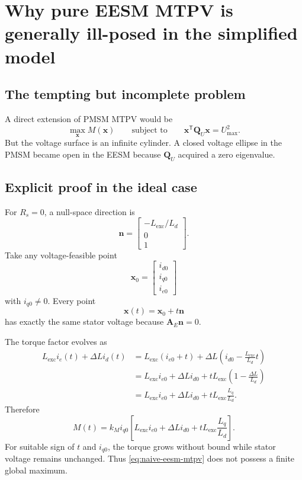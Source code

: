 \documentclass[11pt,a4paper]{article}
\newcommand{\Rs}{R_s}
\newcommand{\Ld}{L_d}
\newcommand{\Lq}{L_q}
\newcommand{\Lexc}{L_{\mathrm{exc}}}
\newcommand{\Umax}{U_{\max}}
\newcommand{\T}{\mathsf{T}}
\newcommand{\vct}[1]{\bm{#1}}
\newcommand{\mat}[1]{\bm{#1}}
\begin{document}
\section{Why pure EESM MTPV is generally ill-posed in the simplified model}

\subsection{The tempting but incomplete problem}

A direct extension of PMSM MTPV would be
\begin{equation}
  \max_{\vct x}M(\vct x)
  \qquad\text{subject to}\qquad
  \vct x^\T\mat Q_U\vct x=\Umax^2.
  \label{eq:naive-eesm-mtpv}
\end{equation}
But the voltage surface is an infinite cylinder. A closed voltage ellipse in the PMSM became open in the EESM because $\mat Q_U$ acquired a zero eigenvalue.

\subsection{Explicit proof in the ideal case}

For $\Rs=0$, a null-space direction is
\begin{equation}
  \vct n=
  \begin{bmatrix}
  -\Lexc/\Ld\\0\\1
  \end{bmatrix}.
\end{equation}
Take any voltage-feasible point
\begin{equation}
  \vct x_0=
  \begin{bmatrix}
  i_{d0}\\i_{q0}\\i_{e0}
  \end{bmatrix}
\end{equation}
with $i_{q0}\neq0$. Every point
\begin{equation}
  \vct x(t)=\vct x_0+t\vct n
\end{equation}
has exactly the same stator voltage because $\mat A_E\vct n=0$.

The torque factor evolves as
\begin{align}
  \Lexc i_e(t)+\Delta L i_d(t)
  &=\Lexc(i_{e0}+t)
  +\Delta L\left(i_{d0}-\frac{\Lexc}{\Ld}t\right)\\
  &=\Lexc i_{e0}+\Delta L i_{d0}
  +t\Lexc\left(1-\frac{\Delta L}{\Ld}\right)\\
  &=\Lexc i_{e0}+\Delta L i_{d0}
  +t\Lexc\frac{\Lq}{\Ld}.
  \label{eq:torque-along-null}
\end{align}
Therefore
\begin{equation}
  M(t)=k_M i_{q0}
  \left[
  \Lexc i_{e0}+\Delta L i_{d0}
  +t\Lexc\frac{\Lq}{\Ld}
  \right].
\end{equation}
For suitable sign of $t$ and $i_{q0}$, the torque grows without bound while stator voltage remains unchanged. Thus \eqref{eq:naive-eesm-mtpv} does not possess a finite global maximum.
\end{document}
